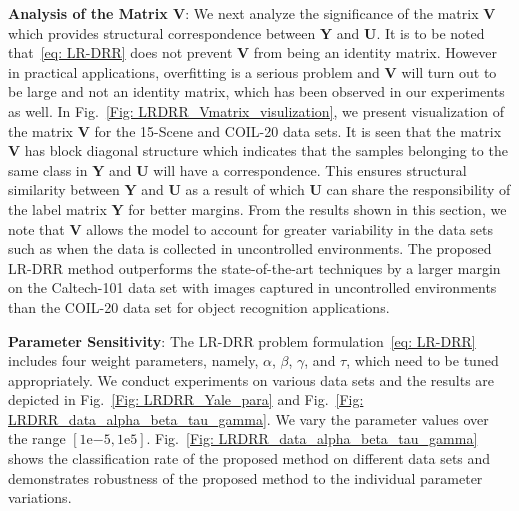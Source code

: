 \noindent\textbf{Analysis of the Matrix $\mathbf{V}$}: We next analyze the significance of the matrix $\mathbf{V}$ which provides structural correspondence between $\mathbf{Y}$ and $\mathbf{U}$. It is to be noted that~\eqref{eq: LR-DRR} does not prevent $\mathbf{V}$ from being an identity matrix. However in practical applications, overfitting is a serious problem and $\mathbf{V}$ will turn out to be large and not an identity matrix, which has been observed in our experiments as well. In Fig.~\ref{Fig: LRDRR_Vmatrix_visulization}, we present visualization of the matrix $\mathbf{V}$ for the 15-Scene and COIL-20 data sets. It is seen that the matrix $\mathbf{V}$ has block diagonal structure which indicates that the samples belonging to the same class in $\mathbf{Y}$ and $\mathbf{U}$ will have a correspondence. This ensures structural similarity between $\mathbf{Y}$ and $\mathbf{U}$ as a result of which $\mathbf{U}$ can share the responsibility of the label matrix $\mathbf{Y}$ for better margins. From the results shown in this section, we note that $\mathbf{V}$ allows the model to account for greater variability in the data sets such as when the data is collected in uncontrolled environments. The proposed LR-DRR method outperforms the state-of-the-art techniques by a larger margin on the Caltech-101 data set with images captured in uncontrolled environments than the COIL-20 data set for object recognition applications.

\noindent\textbf{Parameter Sensitivity}: The LR-DRR problem formulation~\eqref{eq: LR-DRR} includes four weight parameters, namely, $\alpha$, $\beta$, $\gamma$, and $\tau$, which need to be tuned appropriately. We conduct experiments on various data sets and the results are depicted in Fig.~\ref{Fig: LRDRR_Yale_para} and Fig.~\ref{Fig: LRDRR_data_alpha_beta_tau_gamma}. We vary the parameter values over the range $\left[ 1\mathrm{e}{-5},1\mathrm{e}{5} \right]$. Fig.~\ref{Fig: LRDRR_data_alpha_beta_tau_gamma} shows the classification rate of the proposed method on different data sets and demonstrates robustness of the proposed method to the individual parameter variations.

